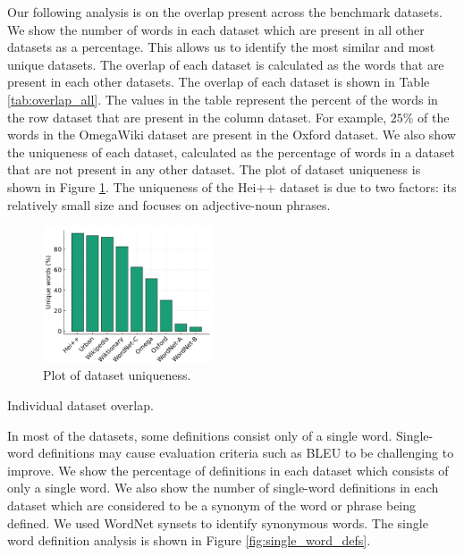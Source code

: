 Our following analysis is on the overlap present across the benchmark datasets. We
show the number of words in each dataset which are present in all other datasets
as a percentage. This allows us to identify the most similar
and most unique datasets. The overlap of each dataset is calculated as the words
that are present in each other datasets. The overlap of each dataset is
shown in Table \ref{tab:overlap_all}. The values in the table represent the percent of the 
words in the row dataset that are present in the column dataset. For example, $25\%$ of the 
words in the OmegaWiki dataset are present in the Oxford dataset.
We also show the uniqueness of each dataset, calculated as the percentage of words in a dataset that are not present in any other dataset. The plot of dataset uniqueness is shown in Figure \ref{fig:uniqueness_plot}. The uniqueness of the Hei++ dataset is due to two factors: its relatively small size and focuses on adjective-noun phrases.


\begin{figure}
    \centering
    \includegraphics[width=0.45\textwidth]{assets/plots/uniqueness_plot.png}
    \caption{Plot of dataset uniqueness.}
    \label{fig:uniqueness_plot}
\end{figure}

\begin{table}
    \centering
    \caption{Individual dataset overlap.}
    
    \label{tab:overlap_all}
\end{table}

In most of the datasets, some definitions consist only of a single word. Single-word
definitions may cause evaluation criteria such as BLEU to be challenging to
improve. We show the percentage of definitions in each dataset which consists of
only a single word. We also show the number of single-word definitions in each
dataset which are considered to be a synonym of the word or phrase being
defined. We used WordNet synsets to identify synonymous words. The
single word definition analysis is shown in Figure \ref{fig:single_word_defs}.

